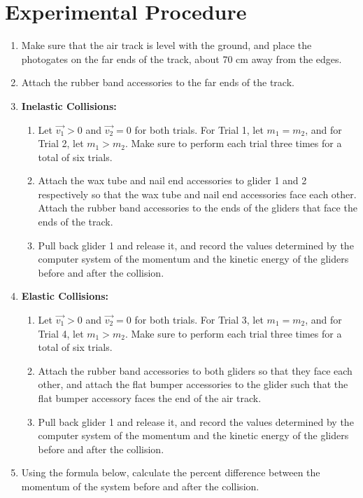 \documentclass{article}
\theoremstyle{definition}
\begin{document}
\section{Experimental Procedure}
\begin{enumerate}
    \item Make sure that the air track is level with the ground, and place the photogates on the far ends of the track, about 70 cm away from the edges.
    \item Attach the rubber band accessories to the far ends of the track.
    \item \textbf{Inelastic Collisions:} 
    \begin{enumerate}
    \item Let $\vec{v_1} > 0$ and $\vec{v_2} = 0$ for both trials. For Trial 1, let $m_1 = m_2$, and for Trial 2, let $m_1 > m_2$. Make sure to perform each trial three times for a total of six trials.
    \item Attach the wax tube and nail end accessories to glider 1 and 2 respectively so that the wax tube and nail end accessories face each other. Attach the rubber band accessories to the ends of the gliders that face the ends of the track. 
    \item Pull back glider 1 and release it, and record the values determined by the computer system of the momentum and the kinetic energy of the gliders before and after the collision.
    \end{enumerate}
    \item \textbf{Elastic Collisions:} 
    \begin{enumerate}
    \item Let $\vec{v_1} > 0$ and $\vec{v_2} = 0$ for both trials. For Trial 3, let $m_1 = m_2$, and for Trial 4, let $m_1 > m_2$. Make sure to perform each trial three times for a total of six trials.
    \item Attach the rubber band accessories to both gliders so that they face each other, and attach the flat bumper accessories to the glider such that the flat bumper accessory faces the end of the air track.
    \item Pull back glider 1 and release it, and record the values determined by the computer system of the momentum and the kinetic energy of the gliders before and after the collision.
\end{enumerate}
    \item Using the formula below, calculate the percent difference between the momentum of the system before and after the collision. \begin{equation}

\end{equation}
\end{enumerate}
\end{document}
